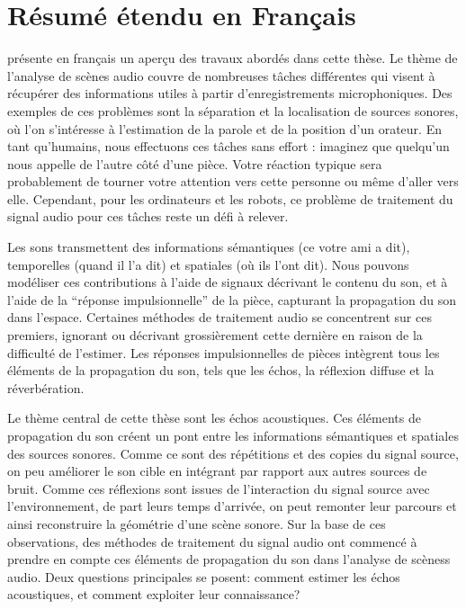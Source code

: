 \chapter*{Résumé étendu en Français}

 présente en français un aperçu des travaux abordés dans cette thèse.
Le thème de l'analyse de scènes audio couvre de nombreuses tâches différentes qui visent à récupérer des informations utiles à partir d'enregistrements microphoniques.
Des exemples de ces problèmes sont la séparation et la localisation de sources sonores, où l'on s'intéresse à l'estimation de la parole et de la position d'un orateur.
En tant qu'humains, nous effectuons ces tâches sans effort : imaginez que quelqu'un nous appelle de l'autre côté d'une pièce.
Votre réaction typique sera probablement de tourner votre attention vers cette personne ou même d'aller vers elle.
Cependant, pour les ordinateurs et les robots, ce problème de traitement du signal audio pour ces tâches reste un défi à relever.

\mynewline
Les sons transmettent des informations sémantiques (ce votre ami a dit), temporelles (quand il l'a dit) et spatiales (où ils l'ont dit).
Nous pouvons modéliser ces contributions à l'aide de signaux décrivant le contenu du son, et à l'aide de la ``réponse impulsionnelle'' de la pièce, capturant la propagation du son dans l'espace.
Certaines méthodes de traitement audio se concentrent sur ces premiers, ignorant ou décrivant grossièrement cette dernière en raison de la difficulté de l'estimer.
Les réponses impulsionnelles de pièces intègrent tous les éléments de la propagation du son, tels que les échos, la réflexion diffuse et la réverbération.

\mynewline
Le thème central de cette thèse sont les échos acoustiques.
Ces éléments de propagation du son créent un pont entre les informations sémantiques et spatiales des sources sonores.
Comme ce sont des répétitions et des copies du signal source, on peu améliorer le son cible en intégrant par rapport aux autres sources de bruit.
Comme ces réflexions sont issues de l'interaction du signal source avec l'environnement, de part leurs temps d'arrivée, on peut remonter leur parcours et ainsi reconstruire la géométrie d'une scène sonore.
Sur la base de ces observations, des méthodes de traitement du signal audio ont commencé à prendre en compte ces éléments de propagation du son dans l'analyse de scèness audio.
Deux questions principales se posent: comment estimer les échos acoustiques, et comment exploiter leur connaissance?

